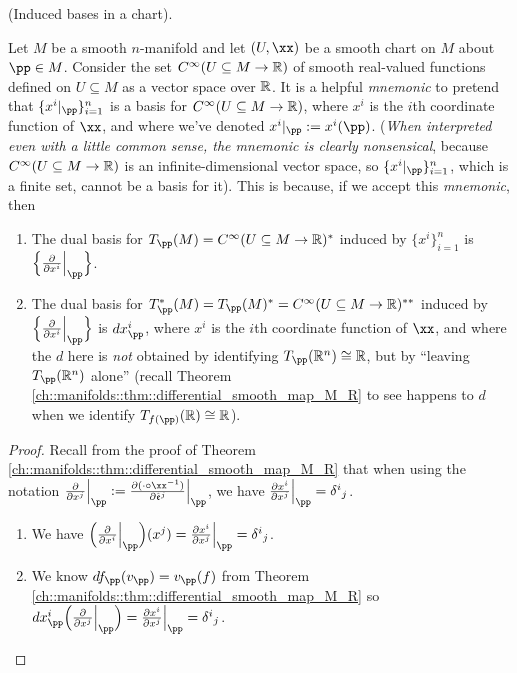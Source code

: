 \begin{theorem}
\label{ch::manifolds::thm::induced_bases_in_a_chart}
    (Induced bases in a chart).
    
    Let $M$ be a smooth $n$-manifold and let $(U, \xx)$ be a smooth chart on $M$ about $\pp \in M$. Consider the set $C^\infty(U \subseteq M \rightarrow \mathbb{R})$ of smooth real-valued functions defined on $U \subseteq M$ as a vector space over $\mathbb{R}$. It is a helpful \textit{mnemonic} to pretend that $\{x^i|_\pp\}_{i = 1}^n$ is a basis for $C^\infty(U \subseteq M \rightarrow \mathbb{R})$, where $x^i$ is the $i$th coordinate function of $\xx$, and where we've denoted $x^i|_\pp := x^i(\pp)$. (\textit{When interpreted even with a little common sense, the mnemonic is clearly nonsensical}, because $C^\infty(U \subseteq M \rightarrow \mathbb{R})$ is an infinite-dimensional vector space, so $\{x^i|_\pp\}_{i = 1}^n$, which is a finite set, cannot be a basis for it). This is because, if we accept this \textit{mnemonic}, then
    
    \begin{enumerate}
        \item The dual basis for $T_\pp(M) = C^\infty(U \subseteq M \rightarrow \R)^*$ induced by $\{x^i\}_{i = 1}^n$ is $\Big\{ \frac{\pd}{\pd x^i}\Big|_\pp \Big\}$.
        \item The dual basis for $T_\pp^*(M) = T_\pp(M)^* = C^\infty(U \subseteq M \rightarrow \R)^{**}$ induced by $\Big\{ \frac{\pd}{\pd x^i}\Big|_\pp \Big\}$ is $dx^i_\pp$, where $x^i$ is the $i$th coordinate function of $\xx$, and where the $d$ here is \textit{not} obtained by identifying $T_\pp(\R^n) \cong \R$, but by ``leaving $T_\pp(\R^n)$ alone'' (recall Theorem \ref{ch::manifolds::thm::differential_smooth_map_M_R} to see happens to $d$ when we identify $T_{f(\pp)}(\R) \cong \R$).
    \end{enumerate}
\end{theorem}

\begin{proof}
    Recall from the proof of Theorem \ref{ch::manifolds::thm::differential_smooth_map_M_R} that when using the notation $\frac{\pd}{\pd x^j}\Big|_\pp := \frac{\pd (\cdot \circ \xx^{-1})}{\pd \see^j}\Big|_\pp$, we have $\frac{\pd x^i}{\pd x^j}\Big|_\pp = \delta^i{}_j$.
    
    \begin{enumerate}
        \item We have $\Big(\frac{\pd}{\pd x^i}\Big|_\pp\Big)(x^j) = \frac{\pd x^i}{\pd x^j}\Big|_\pp = \delta^i{}_j$.
        \item We know $df_\pp(v_\pp) = v_\pp(f)$ from Theorem \ref{ch::manifolds::thm::differential_smooth_map_M_R} so $dx^i_\pp\Big(\frac{\pd}{\pd x^j}\Big|_\pp\Big) = \frac{\pd x^i}{\pd x^j}\Big|_\pp = \delta^i{}_j$. 
    \end{enumerate}
\end{proof}

